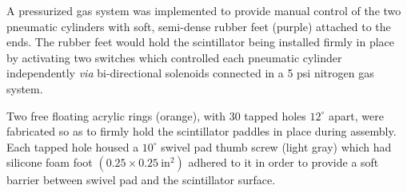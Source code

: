 A pressurized gas system was implemented to provide manual control of the two pneumatic cylinders with soft, semi-dense rubber feet (purple) attached to the ends.  The rubber feet would hold the scintillator being installed firmly in place by activating two switches which controlled each pneumatic cylinder independently \textit{via} bi-directional solenoids connected in a 5 psi nitrogen gas system.

Two free floating acrylic rings (orange), with 30 tapped holes $12^{\circ}$ apart, were fabricated so as to firmly hold the scintillator paddles in place during assembly. 
Each tapped hole housed a $10^{\circ}$ swivel pad thumb screw (light gray) which had silicone foam foot $(0.25 \times 0.25\ \mathrm{in^{2}})$ adhered to it in order to provide a soft barrier between swivel pad and the scintillator surface. 

